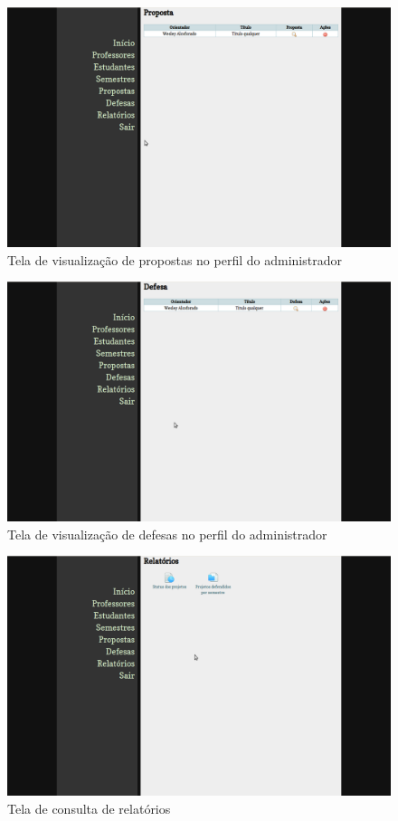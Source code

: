 \begin{figure}[htb!]
\centering
\includegraphics[width=1\textwidth]{fig/telas/administrador/propostas.png}
\caption{Tela de visualização de propostas no perfil do administrador}
\label{fig:propostas}
\end{figure}


\begin{figure}[htb!]
\centering
\includegraphics[width=1\textwidth]{fig/telas/administrador/defesas.png}
\caption{Tela de visualização de defesas no perfil do administrador}
\label{fig:defesas}
\end{figure}

\begin{figure}[htb!]
\centering
\includegraphics[width=1\textwidth]{fig/telas/administrador/relatorios.png}
\caption{Tela de consulta de relatórios}
\label{fig:relatorios}
\end{figure}


